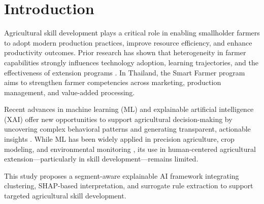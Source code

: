 \section{Introduction}

Agricultural skill development plays a critical role in enabling smallholder farmers to adopt modern
production practices, improve resource efficiency, and enhance productivity outcomes. Prior research
has shown that heterogeneity in farmer capabilities strongly influences technology adoption, learning
trajectories, and the effectiveness of extension programs \citep{feder1985adoption, davis2012impact}. 
In Thailand, the Smart Farmer program aims to strengthen farmer competencies across marketing, 
production management, and value-added processing.

Recent advances in machine learning (ML) and explainable artificial intelligence (XAI) offer new
opportunities to support agricultural decision-making by uncovering complex behavioral patterns and
generating transparent, actionable insights \citep{adadi2018xai, doran2017xai}. While ML has been widely applied
in precision agriculture, crop modeling, and environmental monitoring \citep{hengl2018rf, ferreira2020mlagri}, 
its use in human-centered agricultural extension—particularly in skill development—remains limited.

This study proposes a segment-aware explainable AI framework integrating clustering, SHAP-based
interpretation, and surrogate rule extraction to support targeted agricultural skill development.
